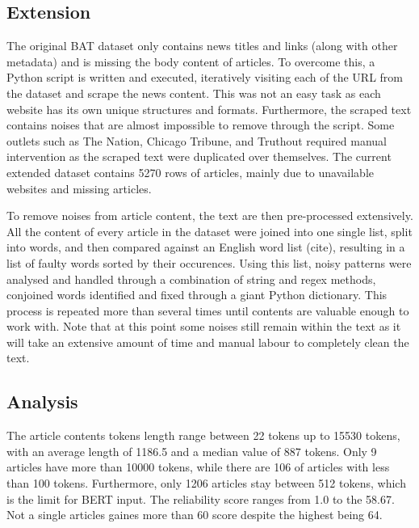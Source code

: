 \subsection{Extension}

The original BAT dataset only contains news titles and links (along with other metadata) and is missing the body content of articles. To overcome this, a Python script is written and executed, iteratively visiting each of the URL from the dataset and scrape the news content. This was not an easy task as each website has its own unique structures and formats. Furthermore, the scraped text contains noises that are almost impossible to remove through the script. Some outlets such as The Nation, Chicago Tribune, and Truthout required manual intervention as the scraped text were duplicated over themselves. The current extended dataset contains 5270 rows of articles, mainly due to unavailable websites and missing articles.

To remove noises from article content, the text are then pre-processed extensively. All the content of every article in the dataset were joined into one single list, split into words, and then compared against an English word list (cite), resulting in a list of faulty words sorted by their occurences. Using this list, noisy patterns were analysed and handled through a combination of string and regex methods, conjoined words identified and fixed through a giant Python dictionary. This process is repeated more than several times until contents are valuable enough to work with. Note that at this point some noises still remain within the text as it will take an extensive amount of time and manual labour to completely clean the text.

\subsection{Analysis}

The article contents tokens length range between 22 tokens up to 15530 tokens, with an average length of 1186.5 and a median value of 887 tokens. Only 9 articles have more than 10000 tokens, while there are 106 of articles with less than 100 tokens. Furthermore, only 1206 articles stay between 512 tokens, which is the limit for BERT input. The reliability score ranges from 1.0 to the 58.67. Not a single articles gaines more than 60 score despite the highest being 64.

